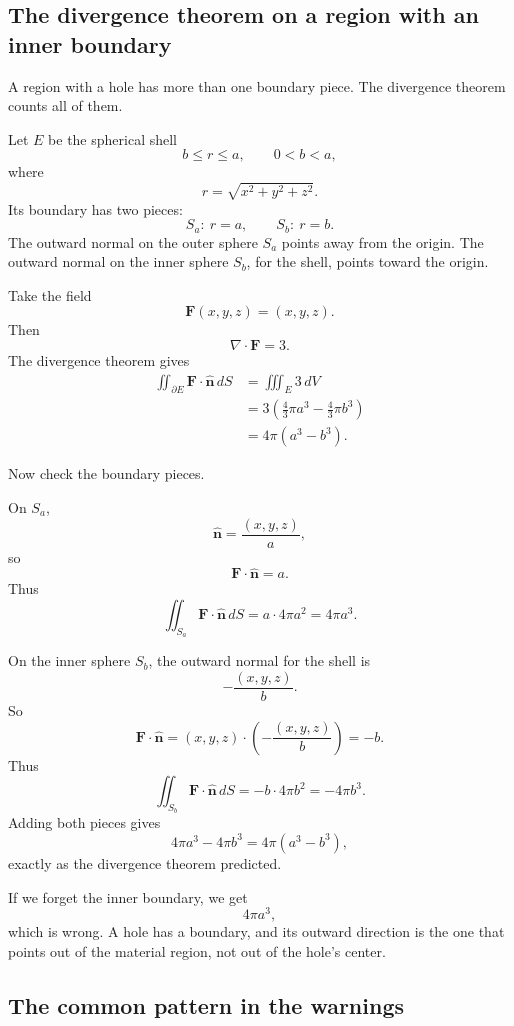 \subsection{The divergence theorem on a region with an inner boundary}

A region with a hole has more than one boundary piece.  The divergence theorem counts
all of them.

Let \(E\) be the spherical shell
\[
    b\le r\le a,
    \qquad
    0<b<a,
\]
where
\[
    r=\sqrt{x^2+y^2+z^2}.
\]
Its boundary has two pieces:
\[
    S_a:\ r=a,
    \qquad
    S_b:\ r=b.
\]
The outward normal on the outer sphere \(S_a\) points away from the origin.  The
outward normal on the inner sphere \(S_b\), for the shell, points toward the origin.

Take the field
\[
    \mathbf F(x,y,z)=(x,y,z).
\]
Then
\[
    \nabla\cdot\mathbf F=3.
\]
The divergence theorem gives
\[
\begin{aligned}
\iint_{\partial E}\mathbf F\cdot\widehat{\mathbf n}\,dS
&=
\iiint_E 3\,dV\\
&=
3\left(\frac43\pi a^3-\frac43\pi b^3\right)\\
&=
4\pi(a^3-b^3).
\end{aligned}
\]

Now check the boundary pieces.

On \(S_a\),
\[
    \widehat{\mathbf n}=\frac{(x,y,z)}{a},
\]
so
\[
    \mathbf F\cdot\widehat{\mathbf n}=a.
\]
Thus
\[
    \iint_{S_a}\mathbf F\cdot\widehat{\mathbf n}\,dS
    =
    a\cdot4\pi a^2
    =
    4\pi a^3.
\]

On the inner sphere \(S_b\), the outward normal for the shell is
\[
    -\frac{(x,y,z)}{b}.
\]
So
\[
    \mathbf F\cdot\widehat{\mathbf n}
    =
    (x,y,z)\cdot\left(-\frac{(x,y,z)}{b}\right)
    =
    -b.
\]
Thus
\[
    \iint_{S_b}\mathbf F\cdot\widehat{\mathbf n}\,dS
    =
    -b\cdot4\pi b^2
    =
    -4\pi b^3.
\]
Adding both pieces gives
\[
    4\pi a^3-4\pi b^3
    =
    4\pi(a^3-b^3),
\]
exactly as the divergence theorem predicted.

If we forget the inner boundary, we get
\[
    4\pi a^3,
\]
which is wrong.  A hole has a boundary, and its outward direction is the one that points
out of the material region, not out of the hole's center.

\subsection{The common pattern in the warnings}


